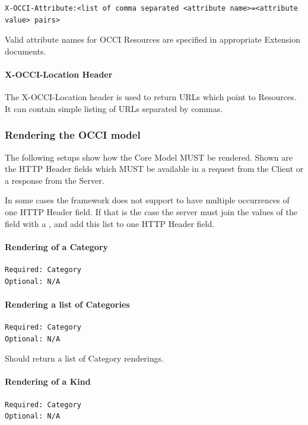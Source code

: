 \documentclass[10pt,a4paper]{article}
\begin{document}
\begin{verbatim}
X-OCCI-Attribute:<list of comma separated <attribute name>=<attribute value> pairs>
\end{verbatim}

Valid attribute names for OCCI Resources are specified in appropriate Extension documents.

\paragraph{X-OCCI-Location Header}

The X-OCCI-Location header is used to return URLs which point to Resources. It can contain simple listing of URLs separated by commas.

\subsubsection{Rendering the OCCI model}

The following setups show how the Core Model MUST be rendered. Shown are the HTTP Header fields which MUST be available in a request from the Client or a response from the Server.

In some cases the framework does not support to have multiple occurrences of one HTTP Header field. If that is the case the server must join the values of the field with a \emph{,} and add this list to one HTTP Header field.

\paragraph{Rendering of a Category}
\begin{verbatim}
Required: Category
Optional: N/A
\end{verbatim}

\paragraph{Rendering a list of Categories}
\begin{verbatim}
Required: Category
Optional: N/A
\end{verbatim}
Should return a list of Category renderings.

\paragraph{Rendering of a Kind}
\begin{verbatim}
Required: Category
Optional: N/A
\end{verbatim}
\end{document}
